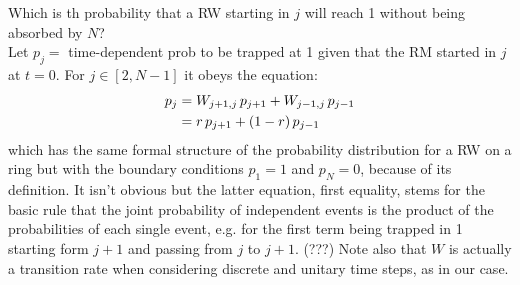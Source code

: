 \documentclass[4apaper,11pt,fleqn]{article}
\theoremstyle{remark}
\theoremstyle{definition}
\begin{document}
Which is th probability that a RW starting in $j$ will reach 1 without being absorbed by $N$?\\
Let $p_j =$ time-dependent prob to be trapped at 1 given that the RM started in $j$ at $t=0$. For $j \in [2,N-1]$ it obeys the equation:
\begin{align}
  \label{eq:pj}
  p_{j} &=W_{j+1, j} \, p_{j+1} + W_{j-1, j}\, p_{j-1} \\ \notag
  &=r\, p_{j+1}  + (1-r)\, p_{j-1}
\end{align}
which has the same formal structure of the probability distribution for a RW on a ring but with the boundary conditions $p_1 = 1$ and $p_N = 0$, because of its definition. It isn't obvious but the latter equation, first equality, stems for the basic rule that the joint probability of independent events is the product of the probabilities of each single event, e.g. for the first term being trapped in 1 starting form $j+1$ and passing from $j$ to $j+1$. (???)
Note also that $W$ is actually a transition rate when considering discrete and unitary time steps, as in our case.

\end{document}
